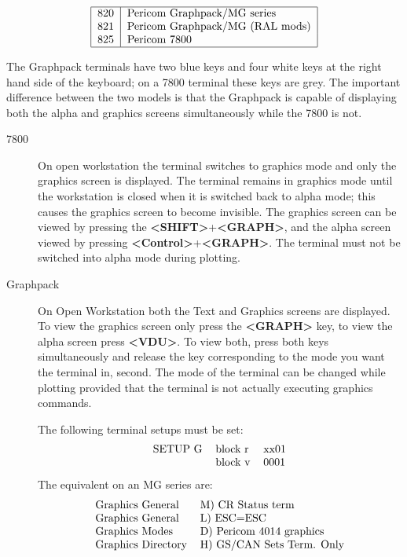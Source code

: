 \documentclass[11pt]{article}
\newcommand{\key}[1]{\fbox{#1}}
\renewcommand{\key}[1]{{\bf<#1>}}
\begin{document}

\[\begin{tabular}{|l|l|}\hline
820 &Pericom Graphpack/MG series\\
821 &Pericom Graphpack/MG (RAL mods)\\
825 &Pericom 7800\\\hline
\end{tabular}\]

The Graphpack terminals have two blue keys and four white keys at the right hand
side of the keyboard; on a 7800 terminal these keys are grey.
The important difference between the two models is that the Graphpack is capable
of displaying both the alpha and graphics screens simultaneously while the 7800
is not.


\begin{description}
\item[7800] On open workstation the terminal switches to graphics mode and 
only the graphics screen is displayed.
The terminal remains in graphics mode until the workstation is closed when it is
switched back to alpha mode; this causes the graphics screen to become
invisible.
The graphics screen can be viewed by pressing the \key{SHIFT}+\key{GRAPH},
and the alpha screen viewed by pressing \key{Control}+\key{GRAPH}.
The terminal must not be switched into alpha mode during plotting.
\item[Graphpack] On Open Workstation both the Text and Graphics screens 
are displayed.
To view the graphics screen only press the \key{GRAPH} key, to view 
the alpha screen press \key{VDU}.
To view both, press both keys simultaneously and release the key corresponding
to the mode you want the terminal in, second.
The mode of the terminal can be changed while plotting provided that the
terminal is not actually executing graphics commands.

The following terminal setups must be set:
\[\begin{tabular}{lll}
SETUP G &block r &xx01\\
        &block v &0001\\
\end{tabular}\]
The equivalent on an MG series are:
\[\begin{tabular}{ll}
Graphics General   &M) CR Status term\\
Graphics General   &L) ESC=ESC\\
Graphics Modes     &D) Pericom 4014 graphics\\
Graphics Directory &H) GS/CAN Sets Term. Only\\
\end{tabular}\]
\end{description}
\end{document}
